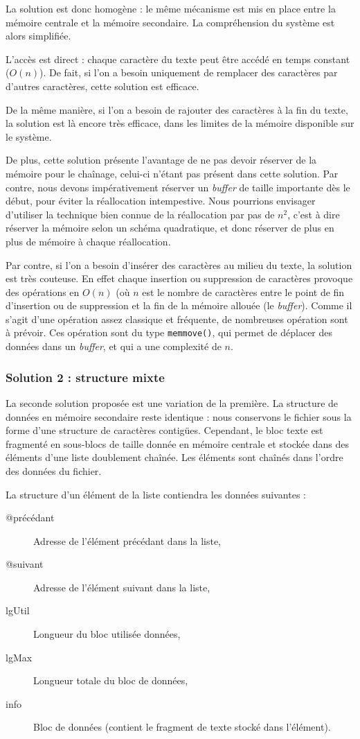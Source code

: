 La solution est donc homogène : le même mécanisme est mis en place entre la
mémoire centrale et la mémoire secondaire. La compréhension du système est
alors simplifiée.

L'accès est direct : chaque caractère du texte peut être accédé en temps
constant ($O(n)$). De fait, si l'on a besoin uniquement de remplacer des
caractères par d'autres caractères, cette solution est efficace.

De la même manière, si l'on a besoin de rajouter des caractères à la fin du
texte, la solution est là encore très efficace, dans les limites de la mémoire
disponible sur le système.

De plus, cette solution présente l'avantage de ne pas devoir réserver de la
mémoire pour le chaînage, celui-ci n'étant pas présent dans cette solution.
Par contre, nous devons impérativement réserver un \emph{buffer} de taille
importante dès le début, pour éviter la réallocation intempestive. Nous
pourrions envisager d'utiliser la technique bien connue de la réallocation par
pas de $n^2$, c'est à dire réserver la mémoire selon un schéma quadratique, et
donc réserver de plus en plus de mémoire à chaque réallocation.

Par contre, si l'on a besoin d'insérer des caractères au milieu du texte, la
solution est très couteuse. En effet chaque insertion ou suppression de
caractères provoque des opérations en $O(n)$ (où $n$ est le nombre de
caractères entre le point de fin d'insertion ou de suppression et la fin de la
mémoire allouée (le \emph{buffer}). Comme il s'agit d'une opération assez
classique et fréquente, de nombreuses opération sont à prévoir.  Ces opération
sont du type \texttt{memmove()}, qui permet de déplacer des données dans un
\emph{buffer}, et qui a une complexité de $n$.

\subsubsection{Solution 2 : structure mixte}
La seconde solution proposée est une variation de la première. La structure de
données en mémoire secondaire reste identique : nous conservons le fichier sous
la forme d'une structure de caractères contigües. Cependant, le bloc texte est
fragmenté en sous-blocs de taille donnée en mémoire centrale et stockée dans
des éléments d'une liste doublement chaînée. Les éléments sont chaînés dans
l'ordre des données du fichier.

La structure d'un élément de la liste contiendra les données suivantes :
\begin{description}
  \item[@précédant] Adresse de l'élément précédant dans la liste,
  \item[@suivant] Adresse de l'élément suivant dans la liste,
  \item[lgUtil] Longueur du bloc utilisée données,
  \item[lgMax] Longueur totale du bloc de données,
  \item[info] Bloc de données (contient le fragment de texte stocké dans
l'élément).
\end{description}

